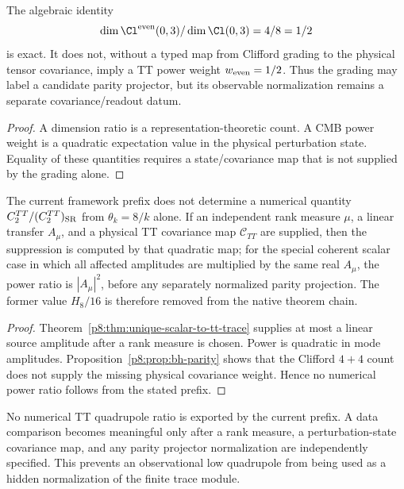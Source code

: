 \documentclass[12pt,a4paper]{article}
\begin{document}
\begin{proposition}
\label{p8:prop:bh-parity}
The algebraic identity
\[
\dim\Cl^{\rm even}(0,3)/\dim\Cl(0,3)=4/8=1/2
\]
is exact.  It does not, without a typed map from Clifford grading to the
physical tensor covariance, imply a TT power weight \(w_{\rm even}=1/2\).
Thus the grading may label a candidate parity projector, but its observable
normalization remains a separate covariance/readout datum.
\end{proposition}

\begin{proof}
A dimension ratio is a representation-theoretic count.  A CMB power weight is
a quadratic expectation value in the physical perturbation state.  Equality
of these quantities requires a state/covariance map that is not supplied by
the grading alone.
\end{proof}

\begin{proposition}
\label{p8:prop:bh-s2}
The current framework prefix does not determine a numerical quantity
\(C_2^{TT}/(C_2^{TT})_{\rm SR}\) from \(\theta_k=8/k\) alone.  If an
independent rank measure \(\mu\), a linear transfer \(A_\mu\), and a physical
TT covariance map \(\mathcal C_{TT}\) are supplied, then the suppression is
computed by that quadratic map; for the special coherent scalar case in which
all affected amplitudes are multiplied by the same real \(A_\mu\), the power
ratio is \(|A_\mu|^2\), before any separately normalized parity projection.
The former value \(H_8/16\) is therefore removed from the native theorem chain.
\end{proposition}

\begin{proof}
Theorem~\ref{p8:thm:unique-scalar-to-tt-trace} supplies at most a linear
source amplitude after a rank measure is chosen.  Power is quadratic in mode
amplitudes.  Proposition~\ref{p8:prop:bh-parity} shows that the Clifford
\(4+4\) count does not supply the missing physical covariance weight.  Hence no
numerical power ratio follows from the stated prefix.
\end{proof}

\begin{remark}
No numerical TT quadrupole ratio is exported by the current prefix.  A data
comparison becomes meaningful only after a rank measure, a perturbation-state
covariance map, and any parity projector normalization are independently
specified.  This prevents an observational low quadrupole from being used as
a hidden normalization of the finite trace module.
\end{remark}
\end{document}
